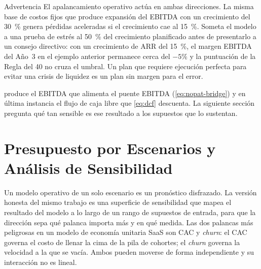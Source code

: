 \begin{admonition}{Advertencia}
El apalancamiento operativo actúa en ambas direcciones. La misma base de costos fijos que
produce expansión del EBITDA con un crecimiento del \qty{30}{\percent} genera pérdidas
aceleradas si el crecimiento cae al \qty{15}{\percent}. Someta el modelo a una prueba de
estrés al \qty{50}{\percent} del crecimiento planificado antes de presentarlo a un consejo
directivo: con un crecimiento de ARR del \qty{15}{\percent}, el margen EBITDA del Año~3 en el
ejemplo anterior permanece cerca del \(-5\%\) y la puntuación de la Regla del 40 no cruza el
umbral. Un plan que requiere ejecución perfecta para evitar una crisis de liquidez es un plan
sin margen para el error.
\end{admonition}

 produce el EBITDA que alimenta el puente EBITDA (\cref{eq:nopat-bridge})
y en última instancia el flujo de caja libre que \cref{eq:dcf} descuenta. La siguiente sección
pregunta qué tan sensible es ese resultado a los supuestos que lo sustentan.


\section{Presupuesto por Escenarios y Análisis de Sensibilidad}\label{sec:scenario-budget}

Un modelo operativo de un solo escenario es un pronóstico disfrazado. La versión honesta del
mismo trabajo es una superficie de sensibilidad que mapea el resultado del modelo a lo largo de
un rango de supuestos de entrada, para que la dirección sepa qué palanca importa más y en qué
medida. Las dos palancas más peligrosas en un modelo de economía unitaria SaaS son CAC y
\emph{churn}: el CAC governa el costo de llenar la cima de la pila de cohortes; el \emph{churn}
governa la velocidad a la que se vacía. Ambos pueden moverse de forma independiente y su
interacción no es lineal.

